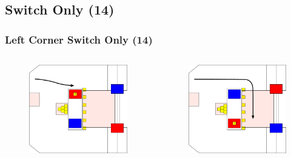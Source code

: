 \documentclass{beamer}
\begin{document}
\subsection{Switch Only (14)}

\begin{frame}
 \frametitle{Left Corner Switch Only \alert{(14)}}
 \begin{columns}
  \begin{figure}
   \includegraphics[scale=0.15]{assets/paths/14_LR}
  \end{figure}
  \begin{figure}
   \includegraphics[scale=0.15]{assets/paths/14_RL}

\end{figure}
\end{columns}
\end{frame}
\end{document}

